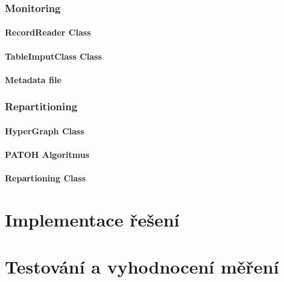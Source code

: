 \documentclass[thesis=M,czech]{FITthesis}[2012/06/26]
\begin{document}
\subsection{Monitoring}

\subsubsection{RecordReader Class}
\subsubsection{TableImputClass Class}
\subsubsection{Metadata file}

\subsection{Repartitioning}
\subsubsection{HyperGraph Class}
\subsubsection{PATOH Algoritmus}
\subsubsection{Repartioning Class}

\chapter{Implementace řešení}

\chapter{Testování a vyhodnocení měření}



\begin{conclusion}
\end{conclusion}




\appendix
\end{document}
